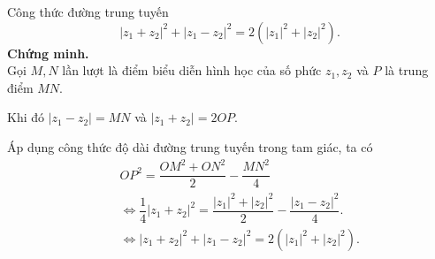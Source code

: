 \begin{dang}{Công thức đường trung tuyến}
	$$|z_1+z_2|^2 + |z_1-z_2|^2 =2 \left( |z_1|^2+ |z_2|^2\right).$$
	\textbf{Chứng minh.}\\
	Gọi $M, N$ lần lượt là điểm biểu diễn hình học của số phức $z_1, z_2$ và $P$ là trung điểm $MN$.
	
	Khi đó $|z_1 -z_2| = MN$ và $|z_1 + z_2 | = 2 OP.$
	
	Áp dụng công thức độ dài đường trung tuyến trong tam giác, ta có
	\vspace{-0.25cm}
	\begin{eqnarray*}
		&	& OP^2 = \dfrac{OM^2+ ON^2}{2} - \dfrac{MN^2}{4}\\
		& &  \Leftrightarrow \dfrac{1}{4} |z_1+z_2|^2 = \dfrac{|z_1|^2 + |z_2|^2}{2} - \dfrac{|z_1-z_2|^2}{4}. \\
		& 	& \Leftrightarrow |z_1+z_2|^2 + |z_1-z_2|^2 =2 \left( |z_1|^2+ |z_2|^2\right).
	\end{eqnarray*}
\end{dang}

